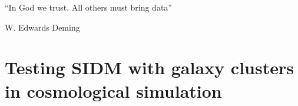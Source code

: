 \documentclass[ucdthesis.tex]{subfiles}
\begin{document}
    \epigraph{``In God we trust. All others must bring data''}{W. Edwards
		Deming} 
    
    \doublespacing
		\setcounter{chapter}{2}
		\chapter{Testing SIDM with galaxy clusters in cosmological simulation}{}{}
		\label{chapter3}

						 

        
\end{document}
